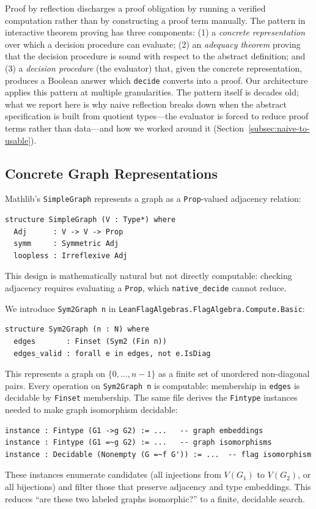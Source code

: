 \documentclass{article}
\newcommand{\lean}[1]{\texttt{#1}}
\begin{document}
Proof by reflection discharges a proof obligation by running a verified
computation rather than by constructing a proof term manually.  The pattern
in interactive theorem proving has three components: (1) a \emph{concrete representation} over which a decision
procedure can evaluate; (2) an \emph{adequacy theorem} proving that the
decision procedure is sound with respect to the abstract definition; and (3)
a \emph{decision procedure} (the evaluator) that, given the concrete
representation, produces a Boolean answer which \lean{decide} converts into a
proof.  Our architecture applies this pattern at multiple granularities.  The
pattern itself is decades old; what we report here is why naive reflection
breaks down when the abstract specification is built from quotient
types---the evaluator is forced to reduce proof terms rather than
data---and how we worked around it
(Section~\ref{subsec:naive-to-usable}).

\subsection{Concrete Graph Representations}

Mathlib's \lean{SimpleGraph} represents a graph as a \lean{Prop}-valued
adjacency relation:
\begin{lstlisting}
structure SimpleGraph (V : Type*) where
  Adj      : V -> V -> Prop
  symm     : Symmetric Adj
  loopless : Irreflexive Adj
\end{lstlisting}
This design is mathematically natural but not directly computable: checking
adjacency requires evaluating a \lean{Prop}, which \lean{native\_decide}
cannot reduce.

We introduce \lean{Sym2Graph n} in
\lean{LeanFlagAlgebras.FlagAlgebra.Compute.Basic}:
\begin{lstlisting}
structure Sym2Graph (n : N) where
  edges       : Finset (Sym2 (Fin n))
  edges_valid : forall e in edges, not e.IsDiag
\end{lstlisting}
This represents a graph on $\{0,\ldots,n-1\}$ as a finite set of unordered
non-diagonal pairs.  Every operation on \lean{Sym2Graph n}
is computable: membership in \lean{edges} is decidable by \lean{Finset}
membership.  The same file derives the \lean{Fintype} instances needed to
make graph isomorphism decidable:
\begin{lstlisting}
instance : Fintype (G1 ->g G2) := ...   -- graph embeddings
instance : Fintype (G1 =~g G2) := ...   -- graph isomorphisms
instance : Decidable (Nonempty (G =~f G')) := ...  -- flag isomorphism
\end{lstlisting}
These instances enumerate candidates (all injections from $V(G_1)$ to
$V(G_2)$, or all bijections) and filter those that preserve adjacency and
type embeddings.  This reduces ``are these two labeled graphs isomorphic?'' to
a finite, decidable search.
\end{document}
